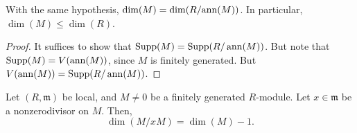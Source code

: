 \documentclass[12pt]{article}
\begin{document}
\begin{cor}
	With the same hypothesis, $\dim(M) = \dim(R/{\operatorname{ann}}(M))$. \newline
	In particular, $\dim(M) \le \dim(R)$.
\end{cor}
\begin{proof} 
	It suffices to show that $\operatorname{Supp}(M) = \operatorname{Supp}(R/\operatorname{ann}(M))$. But note that $\operatorname{Supp}(M) = V(\operatorname{ann}(M))$, since $M$ is finitely generated. But $V(\operatorname{ann}(M)) = \operatorname{Supp}(R/\operatorname{ann}(M))$.
\end{proof}

\begin{thm} \label{thm:nonzerodivisor-dimension-one-drop}
	Let $(R, \mathfrak{m})$ be local, and $M \neq 0$ be a finitely generated $R$-module. \newline
	Let $x \in \mathfrak{m}$ be a nonzerodivisor on $M$. Then,
	\begin{equation*} 
		\dim(M/xM) = \dim(M) - 1.
	\end{equation*}
\end{thm}
\end{document}

